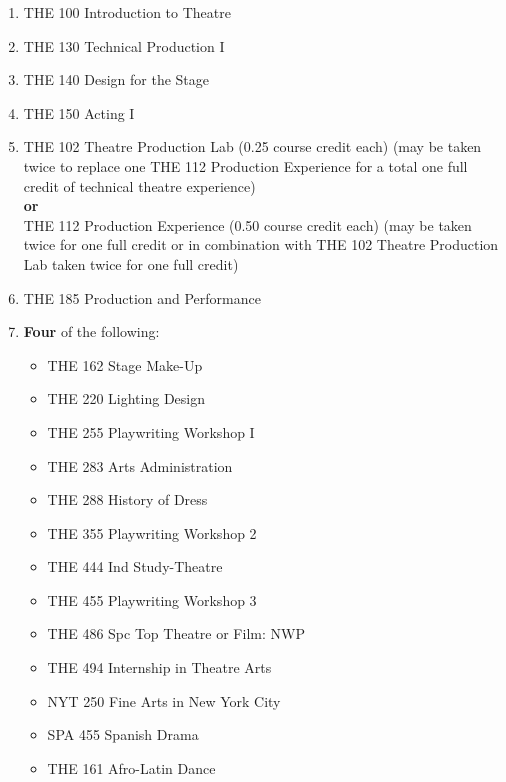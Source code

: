 \documentclass[
  letterpaper,
]{scrbook}
\providecommand{\tightlist}{%
  \setlength{\itemsep}{0pt}\setlength{\parskip}{0pt}}
\begin{document}
\begin{enumerate}
\def\labelenumi{\arabic{enumi}.}
\tightlist
\item
  THE 100 Introduction to Theatre\\
\item
  THE 130 Technical Production I\\
\item
  THE 140 Design for the Stage\\
\item
  THE 150 Acting I\\
\item
  THE 102 Theatre Production Lab (0.25 course credit each) (may be taken
  twice to replace one THE 112 Production Experience for a total one
  full credit of technical theatre experience)\\
  \textbf{or}\\
  THE 112 Production Experience (0.50 course credit each) (may be taken
  twice for one full credit or in combination with THE 102 Theatre
  Production Lab taken twice for one full credit)\\
\item
  THE 185 Production and Performance\\
\item
  \textbf{Four} of the following:

  \begin{itemize}
  \tightlist
  \item
    THE 162 Stage Make-Up\\
  \item
    THE 220 Lighting Design\\
  \item
    THE 255 Playwriting Workshop I\\
  \item
    THE 283 Arts Administration\\
  \item
    THE 288 History of Dress\\
  \item
    THE 355 Playwriting Workshop 2\\
  \item
    THE 444 Ind Study-Theatre\\
  \item
    THE 455 Playwriting Workshop 3\\
  \item
    THE 486 Spc Top Theatre or Film: NWP\\
  \item
    THE 494 Internship in Theatre Arts\\
  \item
    NYT 250 Fine Arts in New York City\\
  \item
    SPA 455 Spanish Drama\\
  \item
    THE 161 Afro-Latin Dance
  \end{itemize}
\end{enumerate}
\end{document}
